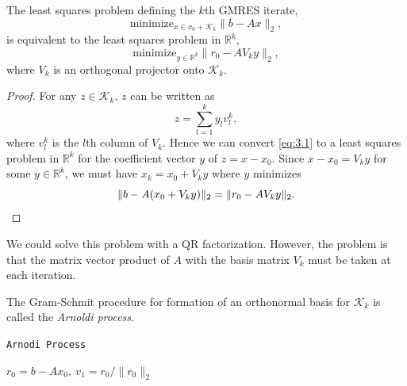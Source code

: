 \begin{lemma}
  The least squares problem defining the $k$th GMRES iterate,
  $$\text{minimize}_{x\in x_0+\mathcal{K}_k}\|b-Ax\|_2,$$
  is equivalent to the least squares problem in $\mathbb{R}^k$,
  \begin{equation}
    \label{eq:3.7}
    \text{minimize}_{y\in\mathbb{R}^k}\|r_0-AV_k y\|_2,
  \end{equation}
  where $V_k$ is an orthogonal projector onto $\mathcal{K}_k.$
\end{lemma}

\begin{proof}
  For any $z\in\mathcal{K}_k$, $z$ can be written
  as $$z=\sum\limits_{l=1}^ky_lv_l^k,$$
  where $v_l^k$ is the $l$th column of $V_k$. Hence we can convert
  \eqref{eq:3.1} to a least squares problem in $\mathbb{R}^k$ for the
  coefficient vector $y$ of $z=x-x_0$. Since $x-x_0=V_ky$ for some
  $y\in\mathbb{R}^k$, we must have $x_k=x_0+V_ky$ where $y$ minimizes
  \begin{equation*}
    \|b-A(x_0+V_ky)\|_2=\|r_0-AV_ky\|_2.\qedhere
  \end{equation*}
\end{proof}

\begin{rmk}
  We could solve this problem with a QR factorization. However, the
  problem is that the matrix vector product of $A$ with the basis matrix
  $V_k$ must be taken at each iteration. 
\end{rmk}

\begin{algo}
  The Gram-Schmit procedure for formation of an orthonormal basis for
  $\mathcal{K}_k$ is called the \emph{Arnoldi process}.
  
    \IncMargin{1em}
  \LinesNumbered
  \begin{algorithm}[H]

    \caption{\texttt{Arnodi Process}}
    \BlankLine
    $r_0=b-Ax_0,\ v_1=r_0/\|r_0\|_2$\;
  \end{algorithm}
  \DecMargin{1em}
\end{algo}

